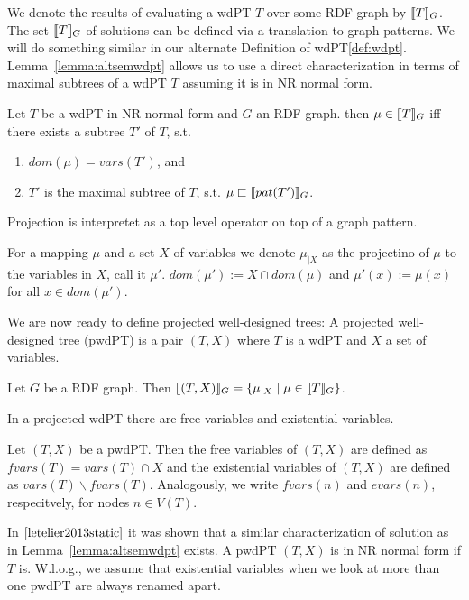 We denote the results of evaluating a wdPT $T$ over some RDF graph by $\llbracket T
\rrbracket_G$. The set $\llbracket T \rrbracket_G$ of solutions can be defined via a translation to
graph patterns. We will do something similar in our alternate Definition of
wdPT\ref{def:wdpt}. Lemma~\ref{lemma:altsemwdpt} allows us to use a direct
characterization in terms of maximal subtrees of a wdPT $T$ assuming it is in NR
normal form.
\begin{lemma}\label{lemma:altsemwdpt}
	Let $T$ be a wdPT in NR normal form and $G$ an RDF graph. then $\mu \in
	\llbracket T\rrbracket_G$ iff there exists a subtree $T'$ of $T$, s.t. 
	\begin{enumerate}
		\item  $dom(\mu) = vars(T')$, and
		\item $T'$ is the maximal subtree of $T$, s.t. $\mu \sqsubset \llbracket
			pat(T') \rrbracket_G$.
	\end{enumerate}
\end{lemma}

Projection is interpretet as a top level operator on top of a graph pattern.
\begin{definition}
For a mapping $\mu$ and a set $X$ of variables we denote $\mu_{|X}$ as the
projectino of $\mu$ to the variables in $X$, call it $\mu'$. $dom(\mu'):=X \cap
dom(\mu)$ and $\mu'(x) := \mu(x)$ for all $x \in dom(\mu')$.
\end{definition}

We are now ready to define projected well-designed trees:
A projected well-designed tree (pwdPT) is a pair $(T,X)$ where $T$ is a wdPT and
$X$ a set of variables.
\begin{definition}
Let $G$ be a RDF graph. 
Then $\llbracket (T,X)\rrbracket_G = \{ \mu_{|X} \mid \mu \in \llbracket T \rrbracket_G\}$.
\end{definition}

In a projected wdPT there are free variables and existential variables.
\begin{definition}
	Let $(T,X)$ be a pwdPT. Then the free variables of $(T,X)$ are defined as
	$fvars(T)= vars(T) \cap X$ and
	the existential variables of $(T,X)$ are defined as $vars(T) \backslash
	fvars(T)$.
	Analogously, we write $fvars(n)$ and $evars(n)$, respecitvely, for nodes
	$n\in V(T)$.
\end{definition}

In $\cite{letelier2013static}$ it was shown that a 
similar characterization of solution as in Lemma~\ref{lemma:altsemwdpt} exists.
A pwdPT $(T,X)$ is in NR normal form if $T$ is. W.l.o.g., we assume that
existential variables when we look at more than one pwdPT are always renamed apart.


